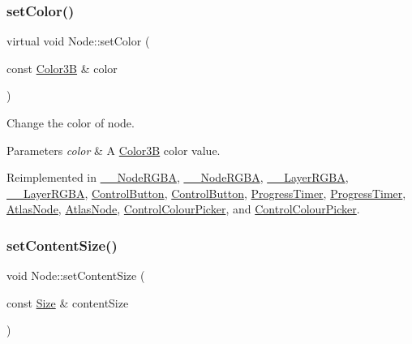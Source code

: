 \mbox{\label{classNode_a2360069ccef753ff1f9665d0e2d3f83a}} 
\subsubsection{\texorpdfstring{set\+Color()}{setColor()}\hspace{0.1cm}{\footnotesize\ttfamily [2/2]}}
{\footnotesize\ttfamily virtual void Node\+::set\+Color (\begin{DoxyParamCaption}\item[{const \hyperlink{structColor3B}{Color3B} \&}]{color }\end{DoxyParamCaption})\hspace{0.3cm}{\ttfamily [virtual]}}

Change the color of node. 
\begin{DoxyParams}{Parameters}
{\em color} & A \hyperlink{structColor3B}{Color3B} color value. \\
\hline
\end{DoxyParams}


Reimplemented in \hyperlink{class____NodeRGBA_adaec184f0ee740557ffddaece7ece996}{\+\_\+\+\_\+\+Node\+R\+G\+BA}, \hyperlink{class____NodeRGBA_adaec184f0ee740557ffddaece7ece996}{\+\_\+\+\_\+\+Node\+R\+G\+BA}, \hyperlink{class____LayerRGBA_aed346ddd9f7f7eab1e3d1417fa9a9831}{\+\_\+\+\_\+\+Layer\+R\+G\+BA}, \hyperlink{class____LayerRGBA_aed346ddd9f7f7eab1e3d1417fa9a9831}{\+\_\+\+\_\+\+Layer\+R\+G\+BA}, \hyperlink{classControlButton_ade75d696a57fbe334ee40152aa2f4bc8}{Control\+Button}, \hyperlink{classControlButton_a7a6e29777bb4a89dab5ac436d92287ac}{Control\+Button}, \hyperlink{classProgressTimer_a3cd315f15a68b541ab276648fa5803cf}{Progress\+Timer}, \hyperlink{classProgressTimer_aabc06a02c225d876ac5746dc6561949f}{Progress\+Timer}, \hyperlink{classAtlasNode_a4205343f55700284ffba22a2988c5445}{Atlas\+Node}, \hyperlink{classAtlasNode_a67a26fd695101fe4efa0533cb3dc9f39}{Atlas\+Node}, \hyperlink{classControlColourPicker_a23536124c2fbdad9fb93b0de8bf9b85e}{Control\+Colour\+Picker}, and \hyperlink{classControlColourPicker_af83da2a45dd64f202132830729711513}{Control\+Colour\+Picker}.

\mbox{\label{classNode_ade113d7fc9244f58ac98a4712da49818}} 
\subsubsection{\texorpdfstring{set\+Content\+Size()}{setContentSize()}\hspace{0.1cm}{\footnotesize\ttfamily [1/2]}}
{\footnotesize\ttfamily void Node\+::set\+Content\+Size (\begin{DoxyParamCaption}\item[{const \hyperlink{classSize}{Size} \&}]{content\+Size }\end{DoxyParamCaption})\hspace{0.3cm}{\ttfamily [virtual]}}

